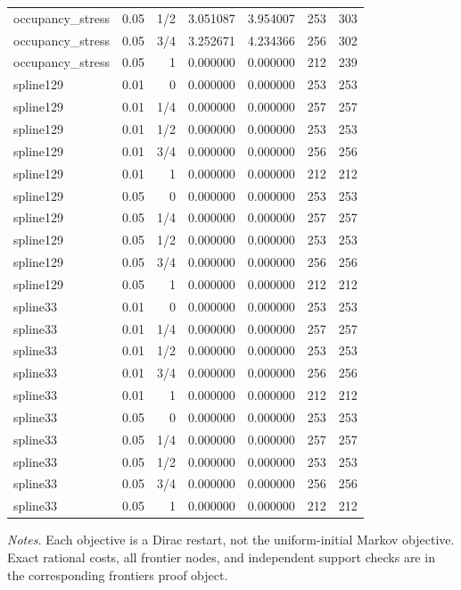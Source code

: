 {\begin{longtable}{lrrrrrr}
occupancy\_stress & 0.05 & 1/2 & 3.051087 & 3.954007 & 253 & 303 \\
occupancy\_stress & 0.05 & 3/4 & 3.252671 & 4.234366 & 256 & 302 \\
occupancy\_stress & 0.05 & 1 & 0.000000 & 0.000000 & 212 & 239 \\
spline129 & 0.01 & 0 & 0.000000 & 0.000000 & 253 & 253 \\
spline129 & 0.01 & 1/4 & 0.000000 & 0.000000 & 257 & 257 \\
spline129 & 0.01 & 1/2 & 0.000000 & 0.000000 & 253 & 253 \\
spline129 & 0.01 & 3/4 & 0.000000 & 0.000000 & 256 & 256 \\
spline129 & 0.01 & 1 & 0.000000 & 0.000000 & 212 & 212 \\
spline129 & 0.05 & 0 & 0.000000 & 0.000000 & 253 & 253 \\
spline129 & 0.05 & 1/4 & 0.000000 & 0.000000 & 257 & 257 \\
spline129 & 0.05 & 1/2 & 0.000000 & 0.000000 & 253 & 253 \\
spline129 & 0.05 & 3/4 & 0.000000 & 0.000000 & 256 & 256 \\
spline129 & 0.05 & 1 & 0.000000 & 0.000000 & 212 & 212 \\
spline33 & 0.01 & 0 & 0.000000 & 0.000000 & 253 & 253 \\
spline33 & 0.01 & 1/4 & 0.000000 & 0.000000 & 257 & 257 \\
spline33 & 0.01 & 1/2 & 0.000000 & 0.000000 & 253 & 253 \\
spline33 & 0.01 & 3/4 & 0.000000 & 0.000000 & 256 & 256 \\
spline33 & 0.01 & 1 & 0.000000 & 0.000000 & 212 & 212 \\
spline33 & 0.05 & 0 & 0.000000 & 0.000000 & 253 & 253 \\
spline33 & 0.05 & 1/4 & 0.000000 & 0.000000 & 257 & 257 \\
spline33 & 0.05 & 1/2 & 0.000000 & 0.000000 & 253 & 253 \\
spline33 & 0.05 & 3/4 & 0.000000 & 0.000000 & 256 & 256 \\
spline33 & 0.05 & 1 & 0.000000 & 0.000000 & 212 & 212 \\
\bottomrule\end{longtable}}
\noindent\emph{Notes.} Each objective is a Dirac restart, not the uniform-initial Markov objective. Exact rational costs, all frontier nodes, and independent support checks are in the corresponding frontiers proof object.
